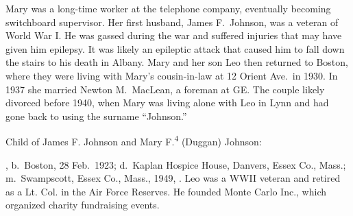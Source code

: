 Mary was a long-time worker at the telephone company, eventually becoming switchboard supervisor.\cite{Mary4DugganPhone} Her first husband, James F.\ Johnson, was a veteran of World War I. He was gassed during the war and suffered injuries that may have given him epilepsy. It was likely an epileptic attack that caused him to fall down the stairs to his death in Albany. Mary and her son Leo then returned to Boston, where they were living with Mary's cousin-in-law at 12 Orient Ave.\ in 1930.\cite{Census1930Mary4Duggan} In 1937 she married Newton M.\ MacLean, a foreman at GE.\cite{Mary4Duggan1939} The couple likely divorced before 1940, when Mary was living alone with Leo in Lynn and had gone back to using the surname ``Johnson.''\cite{Census1940Mary4Duggan}

\begin{KidsIntro}
	Child of James F. Johnson and Mary F.\textsuperscript{4} (Duggan) Johnson:
\end{KidsIntro}

\begin{Kids}
	
	, b.\ Boston, 28 Feb.\ 1923;\cite{Leo5JohnsonBirth} d.\ Kaplan Hospice House, Danvers, Essex Co., Mass.;\cite{Leo5JohnsonObit:1} m.\ Swampscott, Essex Co., Mass., 1949, .\cite{MargaretLangfordMarriage} Leo was a WWII veteran and retired as a Lt. Col. in the Air Force Reserves. He founded Monte Carlo Inc., which organized charity fundraising events.\cite{Leo5JohnsonObit:2}
	
\end{Kids}